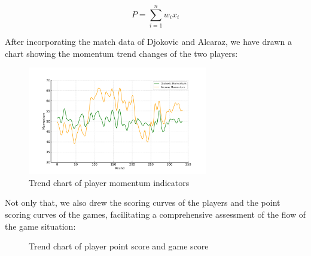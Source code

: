 \documentclass[12pt]{article}  %
\begin{document}
\begin{equation}
	P = \sum_{i=1}^n w_i x_i
\end{equation}

After incorporating the match data of Djokovic and Alcaraz, we have drawn a chart showing the momentum trend changes of the two players:

\begin{figure}[h] %
	\centering %
	\includegraphics[width=0.7\textwidth]{picture/momentum_adjustment_no_title.pdf} %
	\caption{Trend chart of player momentum indicators} %
	\label{fig:example} %
	\end{figure}
\FloatBarrier

Not only that, we also drew the scoring curves of the players and the point scoring curves of the games, facilitating a comprehensive assessment of the flow of the game situation:

\begin{figure}[htbp]
    \centering    
    \caption{Trend chart of player point score and game score}		%
    \label{Fig:Flexibility}									%
\end{figure}
\end{document}
